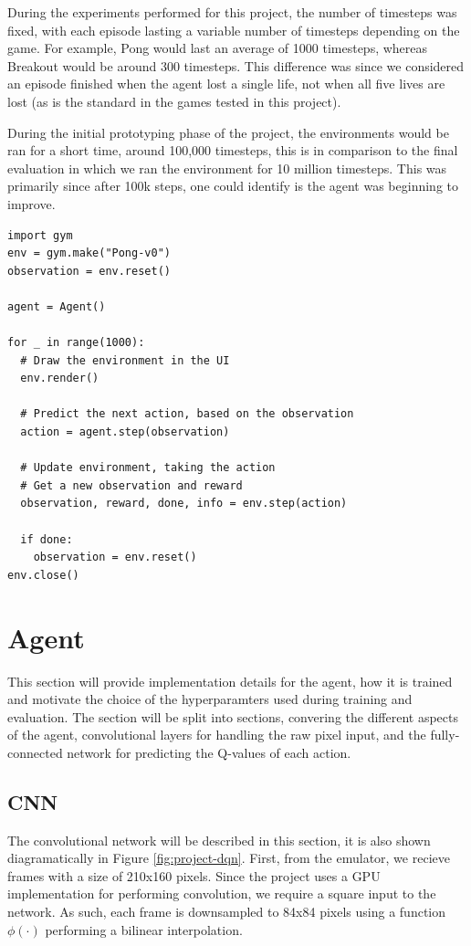 During the experiments performed for this project, the number of timesteps was fixed, with each episode lasting a variable number of timesteps depending on the game. For example, Pong would last an average of 1000 timesteps, whereas Breakout would be around 300 timesteps. This difference was since we considered an episode finished when the agent lost a single life, not when all five lives are lost (as is the standard in the games tested in this project).

During the initial prototyping phase of the project, the environments would be ran for a short time, around 100,000 timesteps, this is in comparison to the final evaluation in which we ran the environment for 10 million timesteps. This was primarily since after 100k steps, one could identify is the agent was beginning to improve.

\begin{code}
	\label{code:basic-gym}
	\begin{verbatim}
import gym
env = gym.make("Pong-v0")
observation = env.reset()

agent = Agent()

for _ in range(1000):
  # Draw the environment in the UI
  env.render()

  # Predict the next action, based on the observation
  action = agent.step(observation)

  # Update environment, taking the action
  # Get a new observation and reward
  observation, reward, done, info = env.step(action)

  if done:
    observation = env.reset()
env.close()
\end{verbatim}
\end{code}

\section{Agent}
This section will provide implementation details for the agent, how it is trained and motivate the choice of the hyperparamters used during training and evaluation. The section will be split into sections, convering the different aspects of the agent, convolutional layers for handling the raw pixel input, and the fully-connected network for predicting the Q-values of each action.

\subsection{CNN}
The convolutional network will be described in this section, it is also shown diagramatically in Figure \ref{fig:project-dqn}. First, from the emulator, we recieve frames with a size of 210x160 pixels. Since the project uses a GPU implementation for performing convolution, we require a square input to the network. As such, each frame is downsampled to 84x84 pixels using a function $\phi(\cdot)$ performing a bilinear interpolation.

